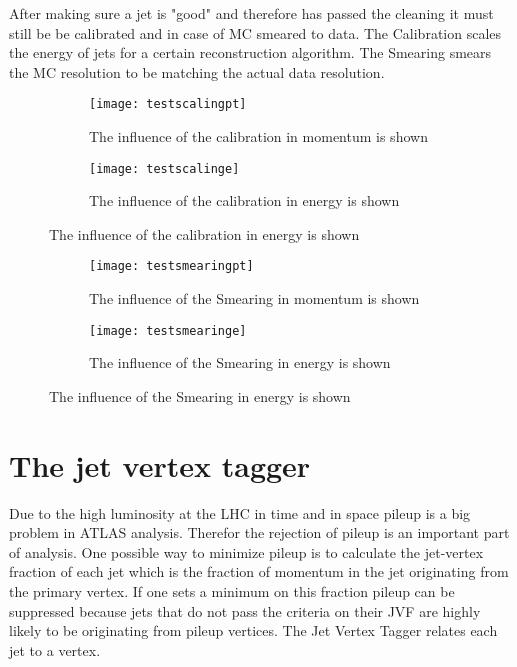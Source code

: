 After making sure a jet is "good" and therefore has passed the cleaning it must still be be calibrated and in case of MC smeared to data. The Calibration scales the energy of jets for a certain reconstruction algorithm. The Smearing smears the MC resolution to be matching the actual data resolution.


\begin{figure}
\centering
\begin{subfigure}[b]{0.5\figwidth}
\texttt{[image: testscalingpt]}
\caption[Influence of the JES on the transversal momentum]{The influence of the calibration in momentum is shown}
\label{fig:testscalingpt}
\end{subfigure}
\begin{subfigure}[b]{0.5\figwidth}
\texttt{[image: testscalinge]}
\caption[Influence of the JES on the energy]{The influence of the calibration in energy is shown}
\label{fig:testscalinge}
\end{subfigure}
\end{figure}


\begin{figure}
\centering
\begin{subfigure}[b]{0.5\figwidth}
\texttt{[image: testsmearingpt]}
\caption[Influence of the Smearing on the transversal momentum]{The influence of the Smearing in momentum is shown}
\label{fig:testsmearingpt}
\end{subfigure}
\begin{subfigure}[b]{0.5\figwidth}
\texttt{[image: testsmearinge]}
\caption[Influence of the Smearing on the energy]{The influence of the Smearing in energy is shown}
\label{fig:testsmearinge}
\end{subfigure}
\end{figure}



\section{The jet vertex tagger}

Due to the high luminosity at the LHC in time and in space pileup is a big problem in ATLAS analysis. Therefor the rejection of pileup is an important part of analysis. One possible way to minimize pileup is to calculate the jet-vertex fraction of each jet which is the fraction of momentum in the jet originating from the primary vertex. If one sets a minimum on this fraction pileup can be suppressed because jets that do not pass the criteria on their JVF are highly likely to be originating from pileup vertices. The Jet Vertex Tagger relates each jet to a vertex.

